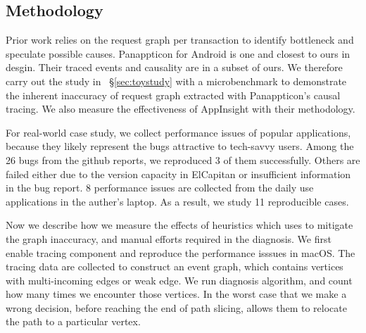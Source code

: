 \subsection{Methodology} \label{sec:methodology}


Prior work relies on the request graph per transaction to identify bottleneck
and speculate possible causes. Panappticon for Android is one and closest to
ours in desgin. Their traced events and causality are in a subset of ours.  We
therefore carry out the study in ~\S\ref{sec:toystudy} with a microbenchmark to
demonstrate the inherent inaccuracy of request graph extracted with
Panappticon's causal tracing. We also measure the effectiveness of AppInsight
with their methodology.

For real-world case study, we collect performance issues of popular
applications, because they likely represent the bugs attractive to tech-savvy
users. Among the 26 bugs from the github reports, we reproduced 3 of them
successfully. Others are failed either due to the version capacity in ElCapitan
or insufficient information in the bug report. 8 performance issues are
collected from the daily use applications in the auther's laptop. As a result,
we study 11 reproducible cases. 

Now we describe how we measure the effects of heuristics which \xxx uses to
mitigate the graph inaccuracy, and manual efforts required in the diagnosis. We
first enable tracing component and reproduce the performance isssues in macOS.
The tracing data are collected to construct an event graph, which contains
vertices with multi-incoming edges or weak edge.
We run \xxx diagnosis algorithm, and count how many times we encounter those vertices.
In the worst case
that we make a wrong decision, before reaching the end of path slicing, \xxx
allows them to relocate the path to a particular vertex.

